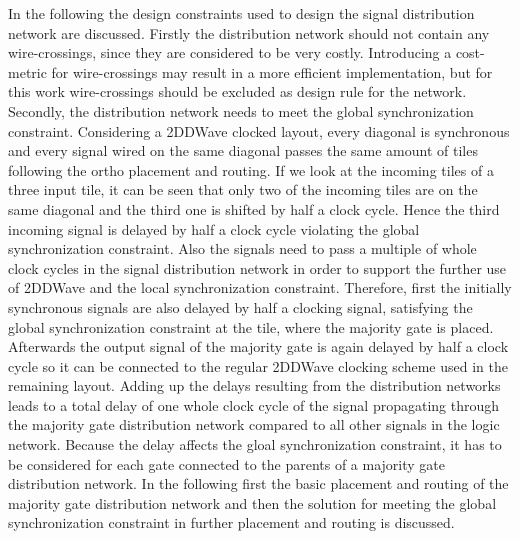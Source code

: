 In the following the design constraints used to design the signal distribution network are discussed. Firstly the distribution network should not contain any wire-crossings, since they are considered to be very costly. Introducing a cost-metric for wire-crossings may result in a more efficient implementation, but for this work wire-crossings should be excluded as design rule for the network. Secondly, the distribution network needs to meet the global synchronization constraint. Considering a 2DDWave clocked layout, every diagonal is synchronous and every signal wired on the same diagonal passes the same amount of tiles following the ortho placement and routing. If we look at the incoming tiles of a three input tile, it can be seen that only two of the incoming tiles are on the same diagonal and the third one is shifted by half a clock cycle. Hence the third incoming signal is delayed by half a clock cycle violating the global synchronization constraint. Also the signals need to pass a multiple of whole clock cycles in the signal distribution network in order to support the further use of 2DDWave and the local synchronization constraint. Therefore, first the initially synchronous signals are also delayed by half a clocking signal, satisfying the global synchronization constraint at the tile, where the majority gate is placed. Afterwards the output signal of the majority gate is again delayed by half a clock cycle so it can be connected to the regular 2DDWave clocking scheme used in the remaining layout. Adding up the delays resulting from the distribution networks leads to a total delay of one whole clock cycle of the signal propagating through the majority gate distribution network compared to all other signals in the logic network. Because the delay affects the gloal synchronization constraint, it has to be considered for each gate connected to the parents of a majority gate distribution network. In the following first the basic placement and routing of the majority gate distribution network and then the solution for meeting the global synchronization constraint in further placement and routing is discussed. 

